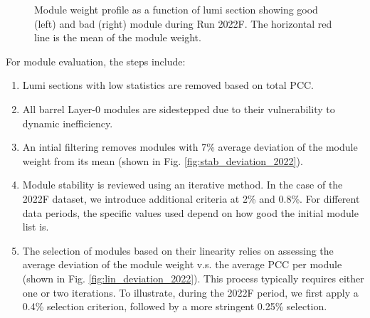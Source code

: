 \begin{figure}[ht]
\begin{subfigure}{0.49\textwidth}
  \label{fig:sub2}
\end{subfigure}
\caption[Good/Bad Module Weight Profile]{Module weight profile as a function of lumi section showing good (left) and bad (right) module during Run 2022F. The horizontal red line is the mean of the module weight.}
\label{fig:test}
\end{figure}



For module evaluation, the steps include:
\begin{enumerate}
    \item Lumi sections with low statistics are removed based on total PCC.
    \item All barrel Layer-0 modules are sidestepped due to their vulnerability to dynamic inefficiency.
    \item An intial filtering removes modules with 7\% average deviation of the module weight from its mean (shown in Fig. \ref{fig:stab_deviation_2022}). %

    \item Module stability is reviewed using an iterative method. In the case of the 2022F dataset, we introduce additional criteria at 2\% and 0.8\%. For different data periods, the specific values used depend on how good the initial module list is.

    \item The selection of modules based on their linearity relies on assessing the average deviation of the module weight v.s. the average PCC per module (shown in Fig. \ref{fig:lin_deviation_2022}). This process typically requires either one or two iterations. To illustrate, during the 2022F period, we first apply a 0.4\% selection criterion, followed by a more stringent 0.25\% selection.

\end{enumerate}

